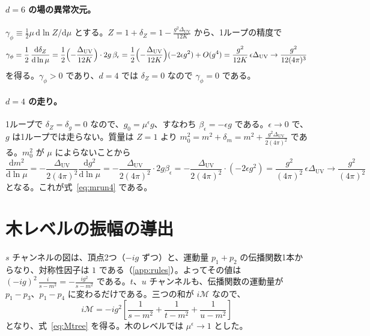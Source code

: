 \documentclass[a4paper,10pt]{ltjsarticle}
\newcommand{\dd}{\mathrm{d}}
\begin{document}
\paragraph{$d=6$ の場の異常次元。}$\gamma_\phi\equiv\frac12\mu\,\dd\ln Z/\dd\mu$ とする。$Z=1+\delta_Z=1-\frac{g^2\Delta_{\mathrm{UV}}}{12K}$ から、1ループの精度で
\begin{equation*}
\gamma_\phi=\frac12\,\frac{\dd\delta_Z}{\dd\ln\mu}=\frac12\Bigl(-\frac{\Delta_{\mathrm{UV}}}{12K}\Bigr)\cdot2g\,\beta_\epsilon=\frac12\Bigl(-\frac{\Delta_{\mathrm{UV}}}{12K}\Bigr)(-2\epsilon g^2)+O(g^4)=\frac{g^2}{12K}\,\epsilon\Delta_{\mathrm{UV}}\to\frac{g^2}{12(4\pi)^3}
\end{equation*}
を得る。$\gamma_\phi>0$ であり、$d=4$ では $\delta_Z=0$ なので $\gamma_\phi=0$ である。

\paragraph{$d=4$ の走り。}1ループで $\delta_Z=\delta_g=0$ なので、$g_0=\mu^\epsilon g$、すなわち $\beta_\epsilon=-\epsilon g$ である。$\epsilon\to0$ で、$g$ は1ループでは走らない。質量は $Z=1$ より $m_0^2=m^2+\delta_m=m^2+\frac{g^2\Delta_{\mathrm{UV}}}{2(4\pi)^2}$ である。$m_0^2$ が $\mu$ によらないことから
\begin{equation*}
\frac{\dd m^2}{\dd\ln\mu}=-\frac{\Delta_{\mathrm{UV}}}{2(4\pi)^2}\frac{\dd g^2}{\dd\ln\mu}=-\frac{\Delta_{\mathrm{UV}}}{2(4\pi)^2}\cdot2g\beta_\epsilon=-\frac{\Delta_{\mathrm{UV}}}{2(4\pi)^2}\cdot(-2\epsilon g^2)=\frac{g^2}{(4\pi)^2}\,\epsilon\Delta_{\mathrm{UV}}\to\frac{g^2}{(4\pi)^2}
\end{equation*}
となる。これが式~\eqref{eq:mrun4} である。

\section{木レベルの振幅の導出}\label{app:tree}

$s$ チャンネルの図は、頂点2つ（$-ig$ ずつ）と、運動量 $p_1+p_2$ の伝播関数1本からなり、対称性因子は $1$ である（\ref{app:rules}）。よってその値は $(-ig)^2\,\frac{i}{s-m^2}=-\frac{ig^2}{s-m^2}$ である。$t$、$u$ チャンネルも、伝播関数の運動量が $p_1-p_3$、$p_1-p_4$ に変わるだけである。三つの和が $i\mathcal{M}$ なので、
\begin{equation*}
i\mathcal{M}=-ig^2\left[\frac{1}{s-m^2}+\frac{1}{t-m^2}+\frac{1}{u-m^2}\right]
\end{equation*}
となり、式~\eqref{eq:Mtree} を得る。木のレベルでは $\mu^\epsilon\to1$ とした。
\end{document}
